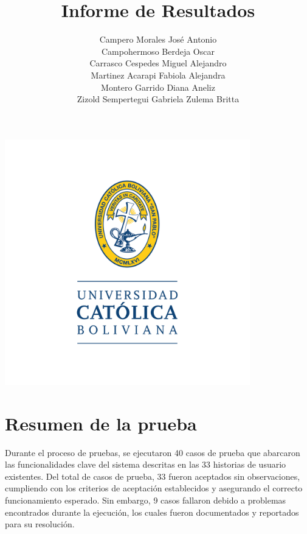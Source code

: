 \documentclass[stu, 12pt, letterpaper, donotrepeattitle, floatsintext, natbib]{apa7}
\title{\Large Informe de Resultados }
\author{
    Campero Morales José Antonio \\
    Campohermoso Berdeja Oscar \\
    Carrasco Cespedes Miguel Alejandro \\
    Martinez Acarapi Fabiola Alejandra \\
    Montero Garrido Diana Aneliz \\
    Zizold Sempertegui Gabriela Zulema Britta
}
\affiliation{Universidad Católica Boliviana}
\begin{document}
\thispagestyle{empty}

\centering
\includegraphics[width=0.8\textwidth]{../imgs/logo-ucb.png} %
\vspace{-5cm} %

\maketitle

\newpage
{}
\renewcommand\contentsname{\large Índice}
\tableofcontents
\setcounter{tocdepth}{2}
\newpage
\renewcommand{\listfigurename}{\large Índice de figuras}
\listoffigures
\newpage
\renewcommand{\listtablename}{\large Índice de tablas}
\listoftables
\newpage

\newpage
\section{\large Resumen de la prueba}
Durante el proceso de pruebas, se ejecutaron 40 casos de prueba que abarcaron las funcionalidades clave del sistema descritas en las 33 historias de usuario existentes. Del total de casos de prueba, 33 fueron aceptados sin observaciones, cumpliendo con los criterios de aceptación establecidos y asegurando el correcto funcionamiento esperado. Sin embargo, 9 casos fallaron debido a problemas encontrados durante la ejecución, los cuales fueron documentados y reportados para su resolución. 
\end{document}

